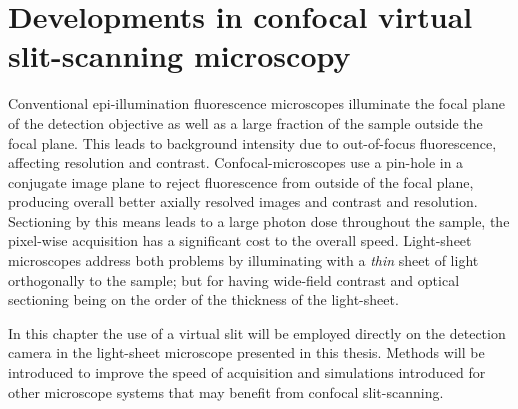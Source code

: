 \ifpdf
    \graphicspath{{Chapters/dualslit/Figs/Raster/}{Chapters/dualslit/Figs/PDF/}{Chapters/dualslit/Figs/}}
\else
    \graphicspath{{Chapters/dualslit/Figs/Vector/}{Chapters/dualslit/Figs/}}
\fi

\chapter{Developments in confocal virtual \gls{slit-scanning} microscopy}\label{chapter:dualslit}



Conventional epi-illumination fluorescence microscopes illuminate the focal plane of the detection objective as well as a large fraction of the sample outside the focal plane.
This leads to background intensity due to out-of-focus fluorescence, affecting resolution and contrast.
Confocal-microscopes use a pin-hole in a conjugate image plane to %
reject fluorescence from outside of the focal plane, producing overall better axially resolved images and contrast and resolution.
Sectioning by this means leads to a large photon dose throughout the sample, the pixel-wise acquisition has a significant cost to the overall speed.
Light-sheet microscopes address both problems by illuminating with a \emph{thin} sheet of light orthogonally to the sample; but for having wide-field contrast and optical sectioning being on the order of the thickness of the light-sheet.

In this chapter the use of a virtual slit will be employed directly on the detection camera in the \gls{light-sheet} microscope presented in this thesis.
Methods will be introduced to improve the speed of acquisition and simulations introduced for other microscope systems that may benefit from confocal \gls{slit-scanning}.

